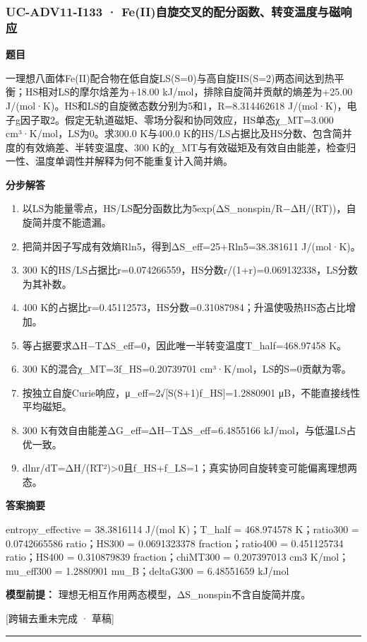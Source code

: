 \documentclass[UTF8,11pt,a4paper]{ctexart}
\begin{document}
\subsubsection*{UC-ADV11-I133 · Fe(II)自旋交叉的配分函数、转变温度与磁响应}
\noindent\textbf{题目}\par
一理想八面体Fe(II)配合物在低自旋LS(S=0)与高自旋HS(S=2)两态间达到热平衡；HS相对LS的摩尔焓差为+18.00 kJ/mol，排除自旋简并贡献的熵差为+25.00 J/(mol·K)。HS和LS的自旋微态数分别为5和1，R=8.314462618 J/(mol·K)，电子g因子取2。假定无轨道磁矩、零场分裂和协同效应，HS单态χ\_MT=3.000 cm³·K/mol，LS为0。求300.0 K与400.0 K的HS/LS占据比及HS分数、包含简并度的有效熵差、半转变温度、300 K的χ\_MT与有效磁矩及有效自由能差，检查归一性、温度单调性并解释为何不能重复计入简并熵。\par
\medskip\noindent\textbf{分步解答}
\begin{enumerate}
\item 以LS为能量零点，HS/LS配分函数比为5exp(ΔS\_nonspin/R−ΔH/(RT))，自旋简并度不能遗漏。
\item 把简并因子写成有效熵Rln5，得到ΔS\_eff=25+Rln5=38.381611 J/(mol·K)。
\item 300 K的HS/LS占据比r=0.074266559，HS分数r/(1+r)=0.069132338，LS分数为其补数。
\item 400 K的占据比r=0.45112573，HS分数=0.31087984；升温使吸热HS态占比增加。
\item 等占据要求ΔH−TΔS\_eff=0，因此唯一半转变温度T\_half=468.97458 K。
\item 300 K的混合χ\_MT=3f\_HS=0.20739701 cm³·K/mol，LS的S=0贡献为零。
\item 按独立自旋Curie响应，μ\_eff=2√[S(S+1)f\_HS]=1.2880901 μB，不能直接线性平均磁矩。
\item 300 K有效自由能差ΔG\_eff=ΔH−TΔS\_eff=6.4855166 kJ/mol，与低温LS占优一致。
\item dlnr/dT=ΔH/(RT²)>0且f\_HS+f\_LS=1；真实协同自旋转变可能偏离理想两态。
\end{enumerate}
\noindent\textbf{答案摘要}\par
entropy\_effective = 38.3816114 J/(mol K)；T\_half = 468.974578 K；ratio300 = 0.0742665586 ratio；HS300 = 0.0691323378 fraction；ratio400 = 0.451125734 ratio；HS400 = 0.310879839 fraction；chiMT300 = 0.207397013 cm3 K/mol；mu\_eff300 = 1.2880901 mu\_B；deltaG300 = 6.48551659 kJ/mol\par
\noindent\textbf{模型前提：}
理想无相互作用两态模型，ΔS\_nonspin不含自旋简并度。\par
\noindent\textcolor{red!65!black}{[跨辑去重未完成 · 草稿]} \par
\medskip\hrule\medskip
\end{document}
